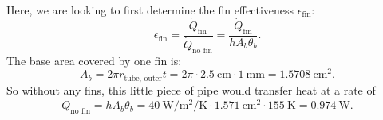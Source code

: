 \begin{derivation}
  Here, we are looking to first determine the fin effectiveness $\epsilon_{\text{fin}}$:
  \begin{equation*}
    \epsilon_{\text{fin}} = \frac{\dot{Q}_{\text{fin}}}{\dot{Q}_{\text{no fin}}} = \frac{\dot{Q}_{\text{fin}}}{h A_b \theta_b}
  .\end{equation*}
  The base area covered by one fin is:
  \begin{equation*}
    A_b = 2\pi r_{\text{tube, outer}} t = 2\pi \cdot \qty{2,5}{\cm} \cdot \qty{1}{\mm}  = \qty{1.5708}{\centi\meter^2}
  .\end{equation*}
  So without any fins, this little piece of pipe would transfer heat at a rate of
  \begin{equation*}
    \dot{Q}_{\text{no fin}} = h A_b \theta_b = \qty{40}{\W\per\m\squared\per\K} \cdot \qty{1,571}{\cm\squared} \cdot \qty{155}{\K}  = \qty{0.974}{\watt}
  .\end{equation*}
  

\end{derivation}
